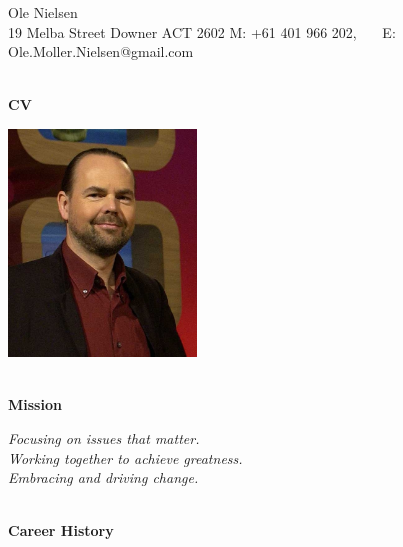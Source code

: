 \documentclass[11pt,a4paper]{article}
\begin{document}
\begin{center}
  Ole Nielsen \\
  19 Melba Street
  Downer ACT 2602
  M: +61 401 966 202, \ \ \ E: Ole.Moller.Nielsen@gmail.com
\end{center}

\begin{center}
  \hrulefill \\
  {\bf CV} \\[-0.2cm]
  \hrulefill
\end{center}

\begin{center}
\includegraphics[width=50mm,keepaspectratio=true]{ole.jpg}
\end{center}

\begin{center}
  \hrulefill \\
  {\bf Mission} \\[-0.2cm]
  \hrulefill
\end{center}

\begin{center}
\emph{Focusing on issues that matter.}\\
\emph{Working together to achieve greatness.}\\
\emph{Embracing and driving change.}
\end{center}



\begin{center}
  \hrulefill \\
  {\bf Career History} \\[-0.2cm]
  \hrulefill
\end{center}
\end{document}
